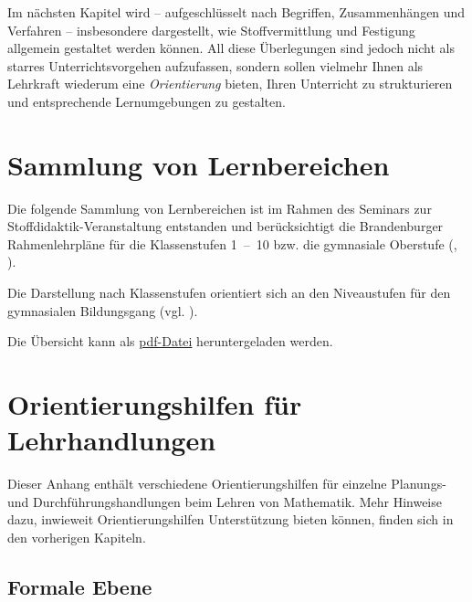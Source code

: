 \documentclass[
]{scrbook}
\theoremstyle{definition}
\theoremstyle{definition}
\theoremstyle{definition}
\theoremstyle{definition}
\theoremstyle{remark}
\begin{document}
Im nächsten Kapitel wird -- aufgeschlüsselt nach Begriffen, Zusammenhängen und Verfahren -- insbesondere dargestellt, wie Stoffvermittlung und Festigung allgemein gestaltet werden können.
All diese Überlegungen sind jedoch nicht als starres Unterrichtsvorgehen aufzufassen, sondern sollen vielmehr Ihnen als Lehrkraft wiederum eine \emph{Orientierung} bieten, Ihren Unterricht zu strukturieren und entsprechende Lernumgebungen zu gestalten.

\appendix


\chapter{Sammlung von Lernbereichen}\label{sammlung-von-lernbereichen}

Die folgende Sammlung von Lernbereichen ist im Rahmen des Seminars zur Stoffdidaktik-Veranstaltung entstanden und berücksichtigt die Brandenburger Rahmenlehrpläne für die Klassenstufen 1~--~10 bzw. die gymnasiale Oberstufe (, ).

Die Darstellung nach Klassenstufen orientiert sich an den Niveaustufen für den gymnasialen Bildungsgang (vgl. ).

Die Übersicht kann als \href{files/Stoffdidaktik2024-SammlungLernbereiche.pdf}{pdf-Datei} heruntergeladen werden.

\chapter{Orientierungshilfen für Lehrhandlungen}\label{orientierungshilfen-fuxfcr-lehrhandlungen}

Dieser Anhang enthält verschiedene Orientierungshilfen für einzelne Planungs- und Durchführungshandlungen beim Lehren von Mathematik. Mehr Hinweise dazu, inwieweit Orientierungshilfen Unterstützung bieten können, finden sich in den vorherigen Kapiteln.

\section{Formale Ebene}\label{orientierungshilfe-formale-ebene}
\end{document}
